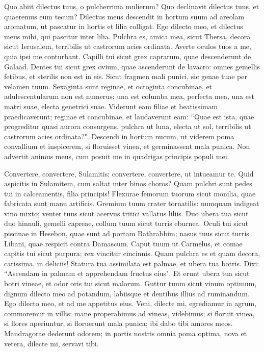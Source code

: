 \begin{biblechapter}  
\verse Quo abiit dilectus tuus, o pulcherrima mulierum? Quo declinavit dilectus tuus, et quaeremus eum tecum? 
\verse Dilectus meus descendit in hortum suum ad areolam aromatum, ut pascatur in hortis et lilia colligat. 
\verse Ego dilecto meo, et dilectus meus mihi, qui pascitur inter lilia. 
\verse Pulchra es, amica mea, sicut Thersa, decora sicut Ierusalem, terribilis ut castrorum acies ordinata. 
\verse Averte oculos tuos a me, quia ipsi me conturbant. Capilli tui sicut grex caprarum, quae descenderunt de Galaad. 
\verse Dentes tui sicut grex ovium, quae ascenderunt de lavacro: omnes gemellis fetibus, et sterilis non est in eis. 
\verse Sicut fragmen mali punici, sic genae tuae per velamen tuum. 
\verse Sexaginta sunt reginae, et octoginta concubinae, et adulescentularum non est numerus; 
\verse una est columba mea, perfecta mea, una est matri suae, electa genetrici suae. Viderunt eam filiae et beatissimam praedicaverunt; reginae et concubinae, et laudaverunt eam: 
\verse “Quae est ista, quae progreditur quasi aurora consurgens, pulchra ut luna, electa ut sol, terribilis ut castrorum acies ordinata?". 
\verse Descendi in hortum nucum, ut viderem poma convallium et inspicerem, si floruisset vinea, et germinassent mala punica. 
\verse Non advertit animus meus, cum posuit me in quadrigas principis populi mei. 
\end{biblechapter}

\begin{biblechapter}  
\verse Convertere, convertere, Sulamitis; convertere, convertere, ut intueamur te. Quid aspicitis in Sulamitem, cum saltat inter binos choros? 
\verse Quam pulchri sunt pedes tui in calceamentis, filia principis! Flexurae femorum tuorum sicut monilia, quae fabricata sunt manu artificis. 
\verse Gremium tuum crater tornatilis: numquam indigeat vino mixto; venter tuus sicut acervus tritici vallatus liliis. 
\verse Duo ubera tua sicut duo hinnuli, gemelli capreae, 
\verse collum tuum sicut turris eburnea. Oculi tui sicut piscinae in Hesebon, quae sunt ad portam Bathrabbim; nasus tuus sicut turris Libani, quae respicit contra Damascum. 
\verse Caput tuum ut Carmelus, et comae capitis tui sicut purpura; rex vincitur cincinnis. 
\verse Quam pulchra es et quam decora, carissima, in deliciis! 
\verse Statura tua assimilata est palmae, et ubera tua botris. 
\verse Dixi: “Ascendam in palmam et apprehendam fructus eius". Et erunt ubera tua sicut botri vineae, et odor oris tui sicut malorum. 
\verse Guttur tuum sicut vinum optimum, dignum dilecto meo ad potandum, labiisque et dentibus illius ad ruminandum. 
\verse Ego dilecto meo, et ad me appetitus eius. 
\verse Veni, dilecte mi, egrediamur in agrum, commoremur in villis; 
\verse mane properabimus ad vineas, videbimus; si floruit vinea, si flores aperiuntur, si floruerunt mala punica; ibi dabo tibi amores meos. 
\verse Mandragorae dederunt odorem; in portis nostris omnia poma optima, nova et vetera, dilecte mi, servavi tibi. 
\end{biblechapter}

